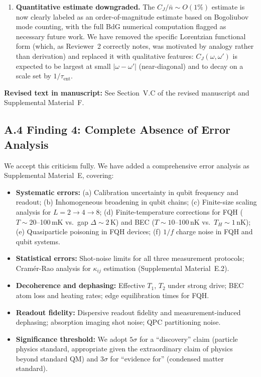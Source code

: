 \documentclass[11pt,a4paper]{article}
\begin{document}
\begin{enumerate}[leftmargin=*]
\item \textbf{Quantitative estimate downgraded.} The $C_J/\bar{n} \sim O(1\%)$ estimate is now clearly labeled as an order-of-magnitude estimate based on Bogoliubov mode counting, with the full BdG numerical computation flagged as necessary future work. We have removed the specific Lorentzian functional form (which, as Reviewer~2 correctly notes, was motivated by analogy rather than derivation) and replaced it with qualitative features: $C_J(\omega, \omega')$ is expected to be largest at small $|\omega - \omega'|$ (near-diagonal) and to decay on a scale set by $1/\tau_{\text{ent}}$.
\end{enumerate}

\textbf{Revised text in manuscript:} See Section~V.C of the revised manuscript and Supplemental Material~F.

\subsection*{A.4 Finding 4: Complete Absence of Error Analysis}

We accept this criticism fully. We have added a comprehensive error analysis as Supplemental Material~E, covering:

\begin{itemize}[leftmargin=*]
\item \textbf{Systematic errors:} (a) Calibration uncertainty in qubit frequency and readout; (b) Inhomogeneous broadening in qubit chains; (c) Finite-size scaling analysis for $L=2 \to 4 \to 8$; (d) Finite-temperature corrections for FQH ($T \sim 20$--100\,mK vs.\ gap $\Delta \sim 2$\,K) and BEC ($T \sim 10$--100\,nK vs.\ $T_H \sim 1$\,nK); (e) Quasiparticle poisoning in FQH devices; (f) $1/f$ charge noise in FQH and qubit systems.
\item \textbf{Statistical errors:} Shot-noise limits for all three measurement protocols; Cram\'er-Rao analysis for $\kappa_{ij}$ estimation (Supplemental Material~E.2).
\item \textbf{Decoherence and dephasing:} Effective $T_1$, $T_2$ under strong drive; BEC atom loss and heating rates; edge equilibration times for FQH.
\item \textbf{Readout fidelity:} Dispersive readout fidelity and measurement-induced dephasing; absorption imaging shot noise; QPC partitioning noise.
\item \textbf{Significance threshold:} We adopt $5\sigma$ for a ``discovery'' claim (particle physics standard, appropriate given the extraordinary claim of physics beyond standard QM) and $3\sigma$ for ``evidence for'' (condensed matter standard).
\end{itemize}
\end{document}
